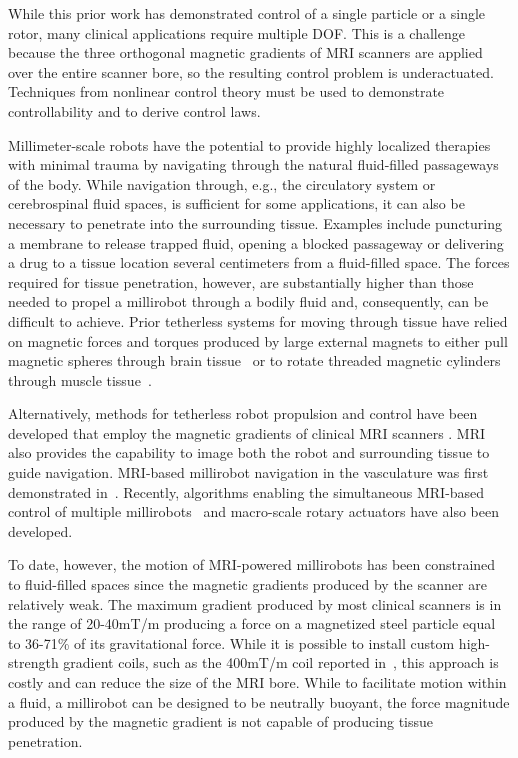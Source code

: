 \documentclass[graybox,usenames]{svmult}
\begin{document}
While this prior work has demonstrated control of a single particle or a single rotor, many clinical applications require multiple DOF. This is a challenge because the three orthogonal magnetic gradients of MRI scanners are applied over the entire scanner bore, so the resulting control problem is underactuated. Techniques from nonlinear control theory must be used to demonstrate controllability and to derive control laws.


Millimeter-scale robots have the potential to provide highly localized therapies with minimal trauma by navigating through the natural fluid-filled passageways of the body. 
While navigation through, e.g., the circulatory system or cerebrospinal fluid spaces, is sufficient for some applications, it can also be necessary to penetrate into the surrounding tissue. Examples include puncturing a membrane to release trapped fluid, opening a blocked passageway or delivering a drug to a tissue location several centimeters from a fluid-filled space.  The forces required for tissue penetration, however, are substantially higher than those needed to propel a millirobot through a bodily fluid and, consequently, can be difficult to achieve.  Prior tetherless systems for moving through tissue have relied on magnetic forces and torques produced by large external magnets to either pull magnetic spheres through brain tissue~\cite{Ritter1996} or to rotate threaded magnetic cylinders through muscle tissue~\cite{ishiyama2001swimming}. 

Alternatively, methods for tetherless robot propulsion and control have been developed that employ the magnetic gradients of clinical MRI scanners  \cite{Chanu2008, Vartholomeos2012,Vartholomeos2013,Becker2014}. MRI also provides the capability to image both the robot and surrounding tissue to guide navigation. MRI-based millirobot navigation in the vasculature was first demonstrated in~\cite{Chanu2008}. Recently, algorithms enabling the simultaneous MRI-based control of multiple millirobots~\cite{Vartholomeos2012,Eqtami2014} and macro-scale rotary actuators \cite{Vartholomeos2013,Becker2014} have also been developed. 

To date, however, the motion of MRI-powered millirobots has been constrained to fluid-filled spaces since the magnetic gradients produced by the scanner are relatively weak. The maximum gradient produced by most clinical scanners is in the range of 20-40mT/m producing a force on a magnetized steel particle equal to 36-71\% of its gravitational force. While it is possible to install custom high-strength gradient coils, such as the 400mT/m coil reported in~\cite{Bigot2014}, %
 this approach is costly and can reduce the size of the MRI bore. While to facilitate motion within a fluid, a millirobot can be designed to be neutrally buoyant, the force magnitude produced by the magnetic gradient is not capable of producing tissue penetration.  
 
\end{document}
